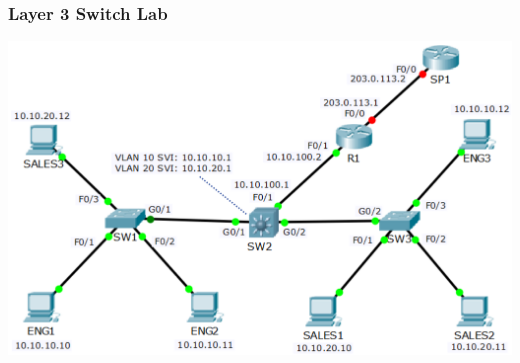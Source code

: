\documentclass[pdflatex,compress,mathserif]{beamer}
\begin{document}
\begin{frame}
	\frametitle{Layer 3 Switch Lab}
	\begin{center}
		\includegraphics[width=0.9\linewidth]{img/img10}
	\end{center}
\end{frame}
\end{document}
